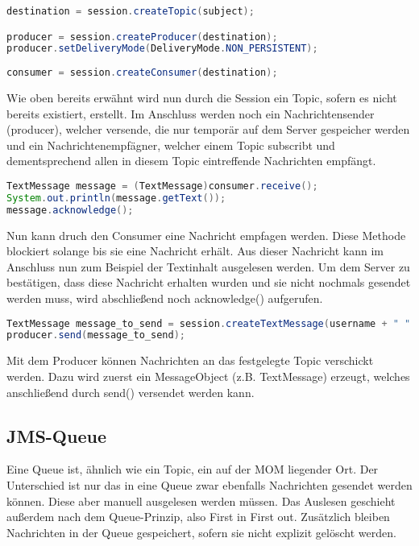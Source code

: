 \documentclass[11pt, a4paper]{article}
\begin{document}
\begin{lstlisting}[language=Java]
destination = session.createTopic(subject);

producer = session.createProducer(destination);
producer.setDeliveryMode(DeliveryMode.NON_PERSISTENT);
		
consumer = session.createConsumer(destination);
\end{lstlisting}

Wie oben bereits erwähnt wird nun durch die Session ein Topic, sofern es nicht bereits existiert, erstellt.
Im Anschluss werden noch ein Nachrichtensender (producer), welcher versende, die nur temporär auf dem Server gespeicher werden und ein Nachrichtenempfägner,
welcher einem Topic subscribt und dementsprechend allen in diesem Topic eintreffende Nachrichten empfängt.

\begin{lstlisting}[language=Java]
TextMessage message = (TextMessage)consumer.receive();
System.out.println(message.getText());
message.acknowledge();
\end{lstlisting}

Nun kann druch den Consumer eine Nachricht empfagen werden. Diese Methode blockiert solange bis sie eine Nachricht erhält. Aus dieser Nachricht kann im
Anschluss nun zum Beispiel der Textinhalt ausgelesen werden. Um dem Server zu bestätigen, dass diese Nachricht erhalten wurden und sie nicht nochmals gesendet
werden muss, wird abschließend noch acknowledge() aufgerufen.

\begin{lstlisting}[language=Java]
TextMessage message_to_send = session.createTextMessage(username + " " +  ip + ": " + message);
producer.send(message_to_send);
\end{lstlisting}

Mit dem Producer können Nachrichten an das festgelegte Topic verschickt werden. Dazu wird zuerst ein MessageObject (z.B. TextMessage) erzeugt, welches
anschließend durch send() versendet werden kann.

\subsection{JMS-Queue}
Eine Queue ist, ähnlich wie ein Topic, ein auf der MOM liegender Ort. Der Unterschied ist nur das in eine Queue zwar ebenfalls Nachrichten gesendet werden
können. Diese aber manuell ausgelesen werden müssen. Das Auslesen geschieht außerdem nach dem Queue-Prinzip, also First in First out. Zusätzlich bleiben
Nachrichten in der Queue gespeichert, sofern sie nicht explizit gelöscht werden.
\end{document}
